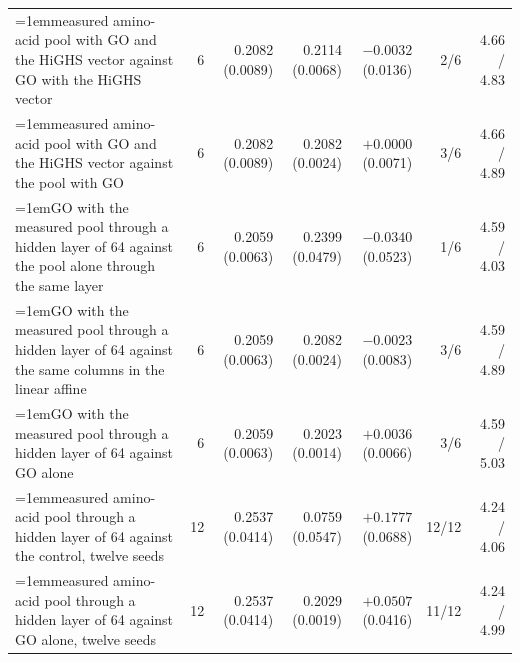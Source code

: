 \begin{table}[H]
\begin{tabular}{@{}>{\raggedright\hangindent=1em\hangafter=1\arraybackslash}p{78.5mm}rrrrrr@{}}
    measured amino-acid pool with GO and the HiGHS vector against GO with the HiGHS vector & 6 & 0.2082 (0.0089) & 0.2114 (0.0068) & $-0.0032$ (0.0136) & 2/6 & 4.66 / 4.83 \\
    measured amino-acid pool with GO and the HiGHS vector against the pool with GO & 6 & 0.2082 (0.0089) & 0.2082 (0.0024) & $+0.0000$ (0.0071) & 3/6 & 4.66 / 4.89 \\
    GO with the measured pool through a hidden layer of 64 against the pool alone through the same layer & 6 & 0.2059 (0.0063) & 0.2399 (0.0479) & $-0.0340$ (0.0523) & 1/6 & 4.59 / 4.03 \\
    GO with the measured pool through a hidden layer of 64 against the same columns in the linear affine & 6 & 0.2059 (0.0063) & 0.2082 (0.0024) & $-0.0023$ (0.0083) & 3/6 & 4.59 / 4.89 \\
    GO with the measured pool through a hidden layer of 64 against GO alone & 6 & 0.2059 (0.0063) & 0.2023 (0.0014) & $+0.0036$ (0.0066) & 3/6 & 4.59 / 5.03 \\
    measured amino-acid pool through a hidden layer of 64 against the control, twelve seeds & 12 & 0.2537 (0.0414) & 0.0759 (0.0547) & $+0.1777$ (0.0688) & 12/12 & 4.24 / 4.06 \\
    measured amino-acid pool through a hidden layer of 64 against GO alone, twelve seeds & 12 & 0.2537 (0.0414) & 0.2029 (0.0019) & $+0.0507$ (0.0416) & 11/12 & 4.24 / 4.99 \\
    \hline
  \end{tabular}
\end{table}

